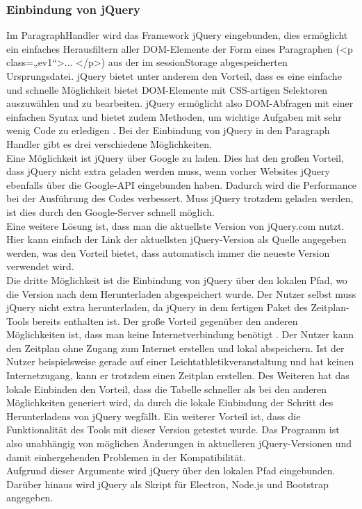 \subsubsection{Einbindung von jQuery}
Im ParagraphHandler wird das Framework jQuery eingebunden, dies ermöglicht ein einfaches Herausfiltern aller DOM-Elemente der Form eines Paragraphen (<p class=„ev1“>... </p>) aus der im sessionStorage abgespeicherten Ursprungsdatei. jQuery bietet unter anderem den Vorteil, dass es eine einfache und schnelle Möglichkeit bietet DOM-Elemente mit CSS-artigen Selektoren auszuwählen und zu bearbeiten. jQuery ermöglicht also DOM-Abfragen mit einer einfachen Syntax und bietet zudem Methoden, um wichtige Aufgaben mit sehr wenig Code zu erledigen \cite[S. 294ff.]{duckett}. Bei der Einbindung von jQuery in den Paragraph Handler gibt es drei verschiedene Möglichkeiten.\\
Eine Möglichkeit ist jQuery über Google zu laden. Dies hat den großen Vorteil, dass jQuery nicht extra geladen werden muss, wenn vorher Websites jQuery ebenfalls über die Google-API eingebunden haben. Dadurch wird die Performance bei der Ausführung des Codes verbessert. Muss jQuery trotzdem geladen werden, ist dies durch den Google-Server schnell möglich. \\
Eine weitere Lösung ist, dass man die aktuellste Version von jQuery.com nutzt. Hier kann einfach der Link der aktuellsten jQuery-Version als Quelle angegeben werden, was den Vorteil bietet, dass automatisch immer die neueste Version verwendet wird. \\
Die dritte Möglichkeit ist die Einbindung von jQuery über den lokalen Pfad, wo die Version nach dem Herunterladen abgespeichert wurde. Der Nutzer selbst muss jQuery nicht extra herunterladen, da jQuery in dem fertigen Paket des Zeitplan-Tools bereits enthalten ist. Der große Vorteil gegenüber den anderen Möglichkeiten ist, dass man keine Internetverbindung benötigt \cite{jQuery}. Der Nutzer kann den Zeitplan ohne Zugang zum Internet erstellen und lokal abspeichern. Ist der Nutzer beispielsweise gerade auf einer Leichtathletikveranstaltung und hat keinen Internetzugang, kann er trotzdem einen Zeitplan erstellen. Des Weiteren hat das lokale Einbinden den Vorteil, dass die Tabelle schneller als bei den anderen Möglichkeiten generiert wird, da durch die lokale Einbindung der Schritt des Herunterladens von jQuery wegfällt. Ein weiterer Vorteil ist, dass die Funktionalität des Tools mit dieser Version getestet wurde. Das Programm ist also unabhängig von möglichen Änderungen in aktuelleren jQuery-Versionen und damit einhergehenden Problemen in der Kompatibilität. \\
Aufgrund dieser Argumente wird jQuery über den lokalen Pfad eingebunden.  
Darüber hinaus wird jQuery als Skript für Electron, Node.js und Bootstrap angegeben. 

